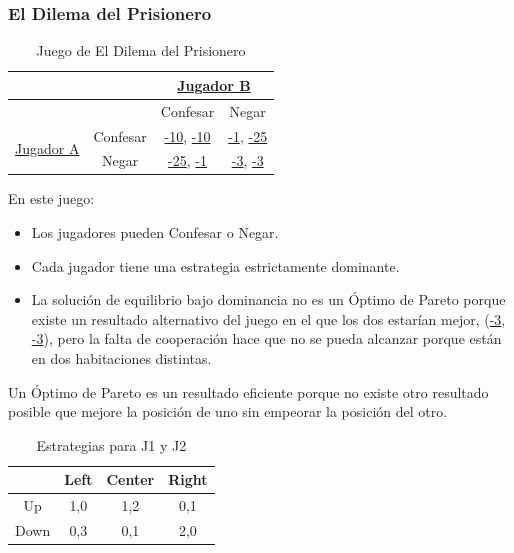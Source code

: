 \documentclass{article}
\newcommand{\ulcolor}[2][Red]{\setulcolor{#1}\ul{#2}}
\begin{document}
            \subsubsection*{El Dilema del Prisionero}
                \begin{table}[h]
                    \centering
                        \begin{tabular}{|c|c|c|c|}
                        \hline
                                                & & \multicolumn{2}{c|}{\ulcolor[Blue]{Jugador B}}  \\ \hline
                                                & & Confesar & Negar  \\ \hline
                        \multirow{2}{*}{\ulcolor[Red]{Jugador A}} 
                                                & Confesar & \ulcolor[Red]{-10}, \ulcolor[Blue]{-10} & \ulcolor[Red]{-1}, \ulcolor[Blue]{-25} \\ \cline{2-4} 
                                                & Negar & \ulcolor[Red]{-25}, \ulcolor[Blue]{-1} & \ulcolor[Red]{-3}, \ulcolor[Blue]{-3} \\\hline
                        \end{tabular}
                    \caption{Juego de El Dilema del Prisionero}
                \end{table}
                En este juego:
                \begin{itemize}
                    \item Los jugadores pueden Confesar o Negar.
                    \item Cada jugador tiene una estrategia estrictamente dominante.
                    \item La solución de equilibrio bajo dominancia no es un Óptimo de Pareto porque existe un resultado alternativo del juego en el que los dos estarían mejor, (\ulcolor[Red]{-3}, \ulcolor[Blue]{-3}), pero la falta de cooperación hace que no se pueda alcanzar porque están en dos habitaciones distintas.
                \end{itemize}
                Un Óptimo de Pareto es un resultado eficiente porque no existe otro resultado posible que mejore la posición de uno sin empeorar la posición del otro.
                \begin{table}[h]
                    \centering
                    \begin{tabular}{|c|c|c|c|}
                        \hline
                            & Left  & Center    & Right \\ \hline
                        Up  & 1,0   & 1,2       & 0,1   \\ \hline
                        Down& 0,3   & 0,1       & 2,0   \\ \hline
                    \end{tabular}
                    \caption{Estrategias para J1 y J2}
                \end{table}
\end{document}
